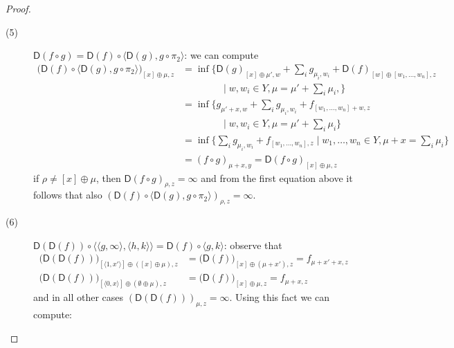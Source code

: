 \begin{proof}
\begin{description}
\item[(5)] $\mathsf D(f\circ g)=\mathsf D(f)\circ \langle \mathsf D(g), g\circ \pi_{2}\rangle$: we can compute
\begin{align*}
\Big( \mathsf D(f)\circ \langle \mathsf D(g), g\circ \pi_{2}\rangle\Big)_{[x]\oplus\mu,z}
&=
\inf \Big\{
\mathsf D(g)_{[x]\oplus\mu',w}+
\sum_{i}g_{\mu_{i},w_{i}}+
\mathsf D(f)_{[w]\oplus [w_{1},\dots, w_{n}],z}\\
&\qquad\qquad \mid
w,w_{i}\in Y, 
 \mu=\mu'+ \sum_{i}\mu_{i},
\Big\}\\
&=
\inf \Big\{
g_{\mu'+x,w}+
\sum_{i}g_{\mu_{i},w_{i}}+
f_{ [w_{1},\dots, w_{n}]+w,z}\\
&\qquad\qquad \mid
w,w_{i}\in Y, 
 \mu= \mu'+\sum_{i}\mu_{i}
\Big\}
\\
&=\inf\Big\{
\sum_{i} g_{\mu_{i},w_{i}} + f_{[w_{1},\dots, w_{n}],z}
\mid
w_{1},\dots, w_{n}\in Y, 
\mu+x=\sum_{i}\mu_{i}
\Big\}
\\
&= (f\circ g)_{\mu+x,y} =\mathsf D(f\circ g)_{[x]\oplus\mu,z}
\end{align*}
if $\rho\neq [x]\oplus \mu$, then $\mathsf D(f\circ g)_{\rho,z}=\infty$ and 
from the first equation above it follows that 
also $( \mathsf D(f)\circ \langle \mathsf D(g), g\circ \pi_{2}\rangle)_{\rho,z}=\infty$.



\item[(6)] $\mathsf D(\mathsf D(f))\circ \langle \langle g,\infty\rangle,\langle h,k\rangle\rangle=\mathsf D(f)\circ  \langle g,k\rangle$:
observe that 
\begin{align*}
\Big(\mathsf D(\mathsf D(f))\Big)_{[\langle 1,x'\rangle]\oplus([x]\oplus \mu),z}&=
\big(\mathsf D(f) \big)_{[x]\oplus (\mu+x'),z }= f_{\mu+x'+x,z}\\
\Big(\mathsf D(\mathsf D(f))\Big)_{[\langle 0,x\rangle]\oplus (\emptyset \oplus \mu),z}&=
\big(\mathsf D(f) \big)_{[x]\oplus \mu,z }= f_{\mu+x,z}
\end{align*}
and in all other cases $(\mathsf D(\mathsf D(f)))_{\mu,z}=\infty$.
Using this fact we can compute:



\end{description}
\end{proof}
